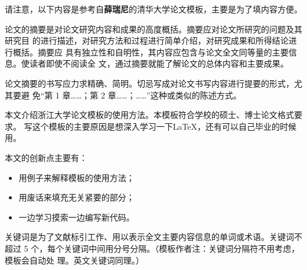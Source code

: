 
\begin{cabstract}
请注意，以下内容是参考自\textbf{薛瑞尼}的清华大学论文模板，主要是为了填内容方便。

论文的摘要是对论文研究内容和成果的高度概括。摘要应对论文所研究的问题及其研究目
的进行描述，对研究方法和过程进行简单介绍，对研究成果和所得结论进行概括。摘要应
具有独立性和自明性，其内容应包含与论文全文同等量的主要信息。使读者即使不阅读全
文，通过摘要就能了解论文的总体内容和主要成果。

论文摘要的书写应力求精确、简明。切忌写成对论文书写内容进行提要的形式，尤其要避
免“第 1 章……；第 2 章……；……”这种或类似的陈述方式。

本文介绍浙江大学论文模板的使用方法。本模板符合学校的硕士、博士论文格式要求。
写这个模板的主要原因是想深入学习一下\LaTeX，还有可以自己毕业的时候用。

本文的创新点主要有：
\begin{itemize}
	\item 用例子来解释模板的使用方法；
	\item 用废话来填充无关紧要的部分；
	\item 一边学习摸索一边编写新代码。
\end{itemize}

关键词是为了文献标引工作、用以表示全文主要内容信息的单词或术语。关键词不超过 5
个，每个关键词中间用分号分隔。（模板作者注：关键词分隔符不用考虑，模板会自动处
理。英文关键词同理。）
\end{cabstract}

